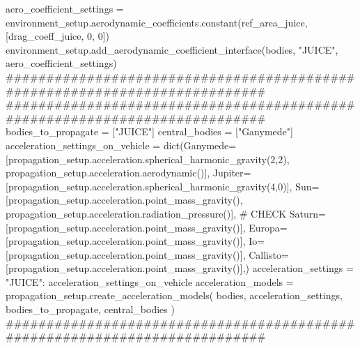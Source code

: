 \markdownRendererInterblockSeparator
{}aero_coefficient_settings = environment_setup.aerodynamic_coefficients.constant(ref_area_juice, [drag_coeff_juice, 0, 0]) environment_setup.add_aerodynamic_coefficient_interface(bodies, "JUICE", aero_coefficient_settings)\markdownRendererInterblockSeparator
{}###########################################################################\markdownRendererInterblockSeparator
{}
\markdownRendererSectionEnd \markdownRendererSectionBegin
{}\markdownRendererInterblockSeparator
{}###########################################################################\markdownRendererInterblockSeparator
{}
\markdownRendererSectionEnd \markdownRendererSectionBegin
{}\markdownRendererInterblockSeparator
{}bodies_to_propagate = ["JUICE"] central_bodies = ["Ganymede"]\markdownRendererInterblockSeparator
{}
\markdownRendererSectionEnd \markdownRendererSectionBegin
{}\markdownRendererInterblockSeparator
{}acceleration_settings_on_vehicle = dict(Ganymede=[propagation_setup.acceleration.spherical_harmonic_gravity(2,2), propagation_setup.acceleration.aerodynamic()], Jupiter=[propagation_setup.acceleration.spherical_harmonic_gravity(4,0)], Sun=[propagation_setup.acceleration.point_mass_gravity(), propagation_setup.acceleration.radiation_pressure()], # CHECK Saturn=[propagation_setup.acceleration.point_mass_gravity()], Europa=[propagation_setup.acceleration.point_mass_gravity()], Io=[propagation_setup.acceleration.point_mass_gravity()], Callisto=[propagation_setup.acceleration.point_mass_gravity()],)\markdownRendererInterblockSeparator
{}
\markdownRendererSectionEnd \markdownRendererSectionBegin
{}\markdownRendererInterblockSeparator
{}acceleration_settings = {"JUICE": acceleration_settings_on_vehicle}\markdownRendererInterblockSeparator
{}
\markdownRendererSectionEnd \markdownRendererSectionBegin
{}\markdownRendererInterblockSeparator
{}acceleration_models = propagation_setup.create_acceleration_models( bodies, acceleration_settings, bodies_to_propagate, central_bodies )\markdownRendererInterblockSeparator
{}###########################################################################\markdownRendererInterblockSeparator
{}
\markdownRendererSectionEnd \markdownRendererSectionBegin
{}\markdownRendererInterblockSeparator
